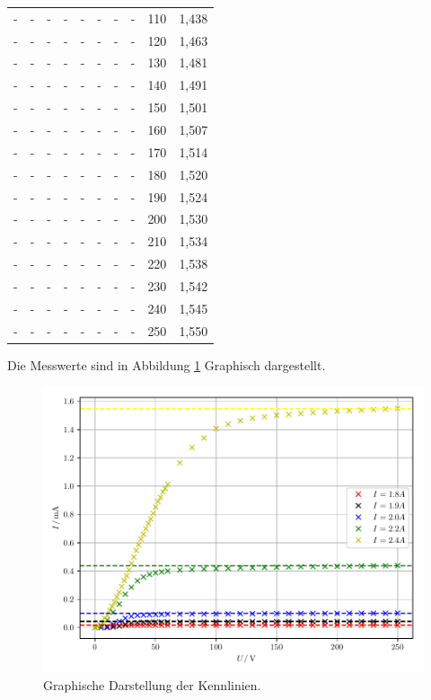 \begin{table}[H]
\begin{tabular}{c c c c c c c c c c}
 -  &   -   &  -  &   -   &  -  &   -   &  -  &   -   & 110 & 1,438 \\
 -  &   -   &  -  &   -   &  -  &   -   &  -  &   -   & 120 & 1,463 \\
 -  &   -   &  -  &   -   &  -  &   -   &  -  &   -   & 130 & 1,481 \\
 -  &   -   &  -  &   -   &  -  &   -   &  -  &   -   & 140 & 1,491 \\
 -  &   -   &  -  &   -   &  -  &   -   &  -  &   -   & 150 & 1,501 \\
 -  &   -   &  -  &   -   &  -  &   -   &  -  &   -   & 160 & 1,507 \\
 -  &   -   &  -  &   -   &  -  &   -   &  -  &   -   & 170 & 1,514 \\
 -  &   -   &  -  &   -   &  -  &   -   &  -  &   -   & 180 & 1,520 \\
 -  &   -   &  -  &   -   &  -  &   -   &  -  &   -   & 190 & 1,524 \\
 -  &   -   &  -  &   -   &  -  &   -   &  -  &   -   & 200 & 1,530 \\
 -  &   -   &  -  &   -   &  -  &   -   &  -  &   -   & 210 & 1,534 \\
 -  &   -   &  -  &   -   &  -  &   -   &  -  &   -   & 220 & 1,538 \\
 -  &   -   &  -  &   -   &  -  &   -   &  -  &   -   & 230 & 1,542 \\
 -  &   -   &  -  &   -   &  -  &   -   &  -  &   -   & 240 & 1,545 \\
 -  &   -   &  -  &   -   &  -  &   -   &  -  &   -   & 250 & 1,550 \\
\bottomrule
  \end{tabular}
\end{table}

Die Messwerte sind in Abbildung \ref{abb:6} Graphisch dargestellt.

\begin{figure}[H]
  \centering
  \includegraphics{plot1.pdf}
  \caption{Graphische Darstellung der Kennlinien.}
  \label{abb:6}
\end{figure}

